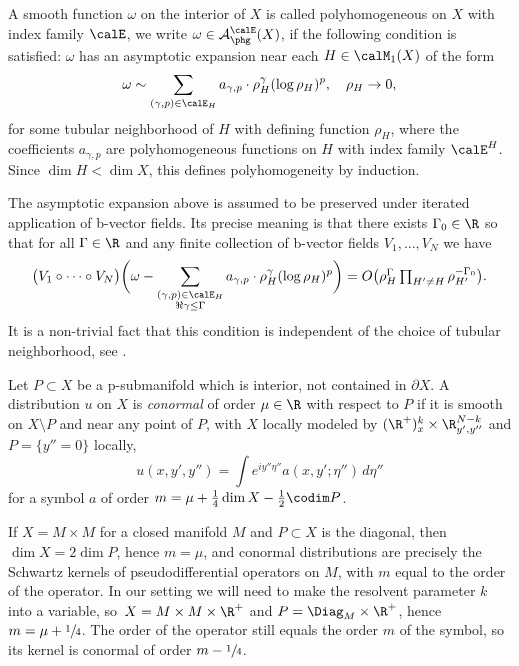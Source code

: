 \begin{defn} A smooth function $\omega$ on the interior of $X$ is called polyhomogeneous
on $X$ with index family $\calE$, we write $ \omega \in \mathcal{A}^{\calE}_{\phg}(X)$, if the following condition is satisfied:
$\omega$ has an asymptotic
expansion near each \hbox{$H\in\calM_1(X)$} of the form
\[
\omega \sim \sum_{(\gamma,p) \in \calE_{H}} a_{\gamma,p} \cdot \rho_{H}^{\gamma}
(\log\rho_H)^{p}, \quad \rho_{H} \to 0,
\]
for some tubular neighborhood of $H$ with defining function $\rho_H$, where the coefficients $a_{\gamma,p}$ are
polyhomogeneous functions on $H$ with index family $\calE^H$.
Since \hbox{$\dim H < \dim X$}, this defines polyhomogeneity by induction.

The asymptotic expansion above is assumed to be preserved under iterated application of b-vector fields. Its precise meaning is that there exists $\Gamma_0\in\R$ so that for all $\Gamma\in\R$ and any finite collection of b-vector fields $V_1,\dots, V_N$ we have
\[
\bigl(V_1 \circ \cdots \circ V_N \bigr) \biggl(
\omega - \sum_{\substack{(\gamma,p) \in \calE_{H}\\\Re\gamma\leq\Gamma}} a_{\gamma,p} \cdot \rho_{H}^{\gamma}
(\log\rho_H)^{p} \biggr)\textstyle
= O \bigl(\rho_H^\Gamma \prod_{H'\neq H} \rho_{H'}^{-\Gamma_0}\bigr).
\]
It is a non-trivial fact that this condition is independent of the choice of tubular neighborhood, see \cite{Mel:CCDMWC}.
\end{defn}

\begin{defn}
 \label{def:conormal distr}
Let $P\subset X$ be a p-submanifold which is interior, \ie not contained in $\partial X$.
A distribution $u$ on $X$ is \emph{conormal} of order $\mu\in\R$ with respect to $P$ if it is smooth on $X\setminus P$ and near any point of $P$, with $X$ locally modeled by $(\R^+)^k_x \times \R^{N-k}_{y',y''}$ and $P=\{y''=0\}$ locally,
\begin{equation}
\label{eqn:def conormal}
u(x,y',y'') = \int e^{iy''\eta''}a(x,y';\eta'')\,d\eta''
\end{equation}
for a symbol $a$ of order $m=\mu+\frac14\dim X - \frac12\codim P$.
\end{defn}
If $X=M\times M$ for a closed manifold $M$ and $P\subset X$ is the diagonal,
then $\dim X=2\dim P$, hence $m=\mu$, and conormal distributions are precisely the Schwartz kernels of pseudodifferential operators on $M$,
with $m$ equal to the order of the operator. In our setting we will need to make the resolvent parameter $k$ into a variable, so~$X=M\times M\times\R^+$ and $P=\Diag_M\times\R^+$, hence $m=\mu+\sfrac14$. The order of the operator still equals the order $m$ of the symbol, so its kernel is conormal of order $m-\sfrac14$.

